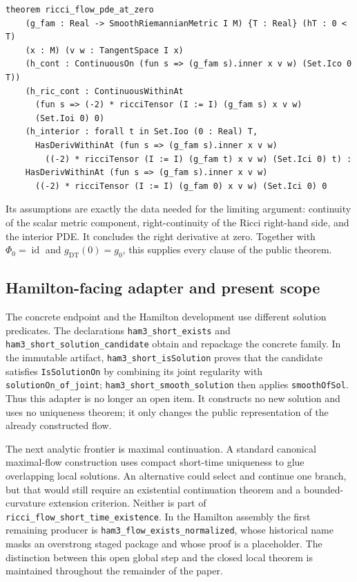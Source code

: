 \documentclass[11pt]{article}
\theoremstyle{plain}
\theoremstyle{definition}
\theoremstyle{remark}
\newcommand{\leanref}[1]{\nolinkurl{#1}}
\begin{document}
\begin{Verbatim}[breaklines=true,breakanywhere=true,fontsize=\small]
theorem ricci_flow_pde_at_zero
    (g_fam : Real -> SmoothRiemannianMetric I M) {T : Real} (hT : 0 < T)
    (x : M) (v w : TangentSpace I x)
    (h_cont : ContinuousOn (fun s => (g_fam s).inner x v w) (Set.Ico 0 T))
    (h_ric_cont : ContinuousWithinAt
      (fun s => (-2) * ricciTensor (I := I) (g_fam s) x v w)
      (Set.Ioi 0) 0)
    (h_interior : forall t in Set.Ioo (0 : Real) T,
      HasDerivWithinAt (fun s => (g_fam s).inner x v w)
        ((-2) * ricciTensor (I := I) (g_fam t) x v w) (Set.Ici 0) t) :
    HasDerivWithinAt (fun s => (g_fam s).inner x v w)
      ((-2) * ricciTensor (I := I) (g_fam 0) x v w) (Set.Ici 0) 0
\end{Verbatim}

Its assumptions are exactly the data needed for the limiting argument:
continuity of the scalar metric component, right-continuity of the Ricci
right-hand side, and the interior PDE.  It concludes the right derivative at
zero.  Together with $\Phi_0=\operatorname{id}$ and
$g_{\mathrm{DT}}(0)=g_0$, this supplies every clause of the public theorem.

\subsection{Hamilton-facing adapter and present scope}
\label{subsec:short-time-hamilton-interface}

The concrete endpoint and the Hamilton development use different solution
  predicates.  The declarations \leanref{ham3_short_exists} and
\leanref{ham3_short_solution_candidate} obtain and repackage the concrete
family.  In the immutable artifact, \leanref{ham3_short_isSolution} proves that the
candidate satisfies \leanref{IsSolutionOn} by combining its joint regularity
with \leanref{solutionOn_of_joint};
\leanref{ham3_short_smooth_solution} then applies \leanref{smoothOfSol}.
Thus this adapter is no longer an open item.  It constructs no new solution
and uses no uniqueness theorem; it only changes the public representation of
the already constructed flow.

The next analytic frontier is maximal continuation.  A standard canonical
maximal-flow construction uses compact short-time uniqueness to glue
overlapping local solutions.  An alternative could select and continue one
branch, but that would still require an existential continuation theorem and
a bounded-curvature extension criterion.  Neither is part of
\leanref{ricci_flow_short_time_existence}.  In the Hamilton assembly the first
remaining producer is \leanref{ham3_flow_exists_normalized}, whose historical
name masks an overstrong staged package and whose proof is a placeholder.  The
distinction between this open global step and the closed
local theorem is maintained throughout the remainder of the paper.
\end{document}

